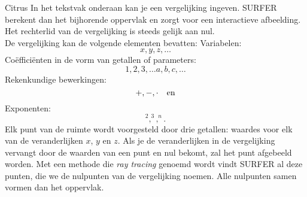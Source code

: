 \begin{surferPage}{Citrus}
In het tekstvak onderaan kan je een vergelijking ingeven. SURFER berekent dan het bijhorende oppervlak en zorgt voor een interactieve afbeelding. Het rechterlid van de vergelijking is steeds gelijk aan nul. 
\\
De vergelijking kan de volgende elementen bevatten:
\newline
Variabelen:
\[x, y, z,\ldots \]
Co\"effici\"enten in de vorm van getallen of parameters:
\[1, 2, 3, \dots a, b, c, \dots \]
Rekenkundige bewerkingen:
\[+,  - , \cdot \quad \textnormal{en} \]
Exponenten:
\[ ^2, ^3, ^n .\]
Elk punt van de ruimte wordt voorgesteld door drie getallen: waardes voor elk van de veranderlijken  $x$, $y$ en $z$. Als je de veranderlijken in de vergelijking vervangt door de waarden van een punt en nul bekomt, zal het punt afgebeeld worden. Met een methode die {\it ray tracing} genoemd wordt vindt SURFER al deze punten, die we de nulpunten van de vergelijking noemen. Alle nulpunten samen vormen dan het oppervlak.
\end{surferPage}
